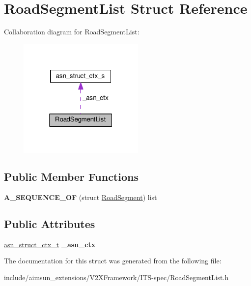 \hypertarget{structRoadSegmentList}{}\section{Road\+Segment\+List Struct Reference}
\label{structRoadSegmentList}


Collaboration diagram for Road\+Segment\+List\+:\nopagebreak
\begin{figure}[H]
\begin{center}
\leavevmode
\includegraphics[width=175pt]{structRoadSegmentList__coll__graph}
\end{center}
\end{figure}
\subsection*{Public Member Functions}
\begin{DoxyCompactItemize}
\item 
{\bfseries A\+\_\+\+S\+E\+Q\+U\+E\+N\+C\+E\+\_\+\+OF} (struct \hyperlink{structRoadSegment}{Road\+Segment}) list\hypertarget{structRoadSegmentList_aee14bd9392d6d9d373bac98517042b51}{}\label{structRoadSegmentList_aee14bd9392d6d9d373bac98517042b51}

\end{DoxyCompactItemize}
\subsection*{Public Attributes}
\begin{DoxyCompactItemize}
\item 
\hyperlink{structasn__struct__ctx__s}{asn\+\_\+struct\+\_\+ctx\+\_\+t} {\bfseries \+\_\+asn\+\_\+ctx}\hypertarget{structRoadSegmentList_ac178bb38837c8d7682b4305e39511e65}{}\label{structRoadSegmentList_ac178bb38837c8d7682b4305e39511e65}

\end{DoxyCompactItemize}


The documentation for this struct was generated from the following file\+:\begin{DoxyCompactItemize}
\item 
include/aimsun\+\_\+extensions/\+V2\+X\+Framework/\+I\+T\+S-\/spec/Road\+Segment\+List.\+h\end{DoxyCompactItemize}
